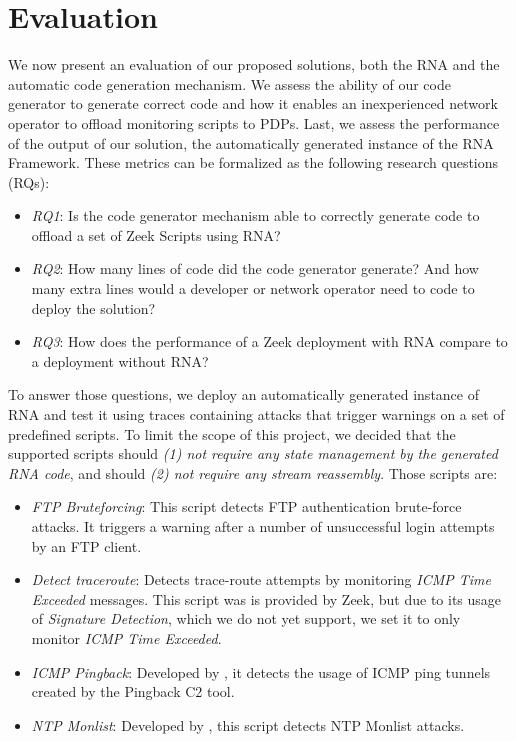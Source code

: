 
\section{Evaluation}
\label{sec:evaluation:evaluation}

We now present an evaluation of our proposed solutions, both the RNA and the automatic code generation mechanism. We assess the ability of our code generator to generate correct code and how it enables an inexperienced network operator to offload monitoring scripts to PDPs. Last, we assess the performance of the output of our solution, the automatically generated instance of the RNA Framework. These metrics can be formalized as the following research questions (RQs):

\begin{itemize}
    \item \textit{RQ1}: Is the code generator mechanism able to correctly generate code to offload a set of Zeek Scripts using RNA?
    
    \item \textit{RQ2}: How many lines of code did the code generator generate? And how many extra lines would a developer or network operator need to code to deploy the solution?
    
    \item \textit{RQ3}: How does the performance of a Zeek deployment with RNA compare to a deployment without RNA?
\end{itemize}

To answer those questions, we deploy an automatically generated instance of RNA and test it using traces containing attacks that trigger warnings on a set of predefined scripts. To limit the scope of this project, we decided that the supported scripts should \textit{(1) not require any state management by the generated RNA code}, and should \textit{(2) not require any stream reassembly}. Those scripts are:

\begin{itemize}
    \item \textit{FTP Bruteforcing}: This script detects FTP authentication brute-force attacks. It triggers a warning after a number of unsuccessful login attempts by an FTP client.
    \item \textit{Detect traceroute}: Detects trace-route attempts by monitoring \textit{ICMP Time Exceeded} messages. This script was is provided by Zeek, but due to its usage of \textit{Signature Detection}, which we do not yet support, we set it to only monitor \textit{ICMP Time Exceeded}.
    \item \textit{ICMP Pingback}: Developed by , it detects the usage of ICMP ping tunnels created by the Pingback C2 tool.
    \item \textit{NTP Monlist}: Developed by , this script detects NTP Monlist attacks.
\end{itemize}


